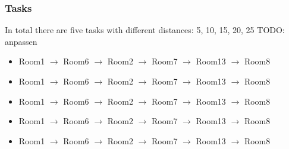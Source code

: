 \documentclass{beamer}
\begin{document}
\begin{frame}
        \frametitle{Tasks}
        
        In total there are five tasks with different distances: 5, 10, 15, 20, 25
        TODO: anpassen
        \begin{itemize}
          \item Room1 $\rightarrow$ Room6 $\rightarrow$ Room2 $\rightarrow$ Room7 $\rightarrow$ Room13 $\rightarrow$ Room8
          \item Room1 $\rightarrow$ Room6 $\rightarrow$ Room2 $\rightarrow$ Room7 $\rightarrow$ Room13 $\rightarrow$ Room8
          \item Room1 $\rightarrow$ Room6 $\rightarrow$ Room2 $\rightarrow$ Room7 $\rightarrow$ Room13 $\rightarrow$ Room8
          \item Room1 $\rightarrow$ Room6 $\rightarrow$ Room2 $\rightarrow$ Room7 $\rightarrow$ Room13 $\rightarrow$ Room8
          \item Room1 $\rightarrow$ Room6 $\rightarrow$ Room2 $\rightarrow$ Room7 $\rightarrow$ Room13 $\rightarrow$ Room8
        \end{itemize}

		
\end{frame}
\end{document}

